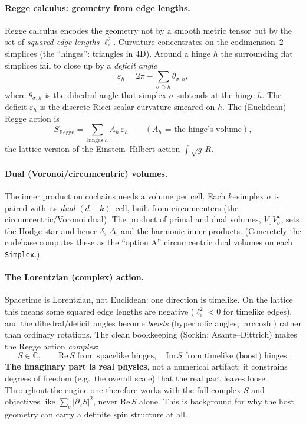 \documentclass[11pt,oneside]{article}
\newcommand{\C}{\mathbb{C}}
\newcommand{\code}[1]{\texttt{#1}}
\begin{document}
\paragraph{Regge calculus: geometry from edge lengths.}
Regge calculus encodes the geometry not by a smooth metric tensor but by the
set of \emph{squared edge lengths} $\ell_e^2$. Curvature concentrates on the
codimension--$2$ simplices (the ``hinges'': triangles in $4$D). Around a hinge
$h$ the surrounding flat simplices fail to close up by a \emph{deficit angle}
\begin{equation}
  \varepsilon_h = 2\pi - \sum_{\sigma\supset h}\theta_{\sigma,h},
\end{equation}
where $\theta_{\sigma,h}$ is the dihedral angle that simplex $\sigma$ subtends
at the hinge $h$. The deficit $\varepsilon_h$ is the discrete Ricci scalar
curvature smeared on $h$. The (Euclidean) Regge action is
\begin{equation}
  S_{\text{Regge}} = \sum_{\text{hinges } h} A_h\,\varepsilon_h
   \qquad(\text{$A_h$ = the hinge's volume}),
\end{equation}
the lattice version of the Einstein--Hilbert action $\int\!\sqrt{g}\,R$.

\paragraph{Dual (Voronoi/circumcentric) volumes.}
The inner product on cochains needs a volume per cell. Each $k$--simplex
$\sigma$ is paired with its \emph{dual} $(d-k)$--cell, built from circumcenters
(the circumcentric/Voronoi dual). The product of primal and dual volumes,
$V_\sigma V^\star_\sigma$, sets the Hodge star and hence $\delta$, $\Delta$, and
the harmonic inner products. (Concretely the codebase computes these as the
``option A'' circumcentric dual volumes on each \code{Simplex}.)

\paragraph{The Lorentzian (complex) action.}
Spacetime is Lorentzian, not Euclidean: one direction is timelike. On the
lattice this means some squared edge lengths are negative ($\ell_e^2<0$ for
timelike edges), and the dihedral/deficit angles become \emph{boosts}
(hyperbolic angles, $\operatorname{arccosh}$) rather than ordinary rotations.
The clean bookkeeping (Sorkin; Asante--Dittrich) makes the Regge action
\emph{complex}:
\begin{equation}
  S \in \C, \qquad
  \text{Re}\,S \text{ from spacelike hinges}, \quad
  \text{Im}\,S \text{ from timelike (boost) hinges}.
\end{equation}
\textbf{The imaginary part is real physics}, not a numerical artifact: it
constrains degrees of freedom (e.g.\ the overall scale) that the real part
leaves loose. Throughout the engine one therefore works with the full complex
$S$ and objectives like $\sum_e|\partial_e S|^2$, never $\text{Re}\,S$ alone.
This is background for why the host geometry can carry a definite spin structure
at all.
\end{document}
